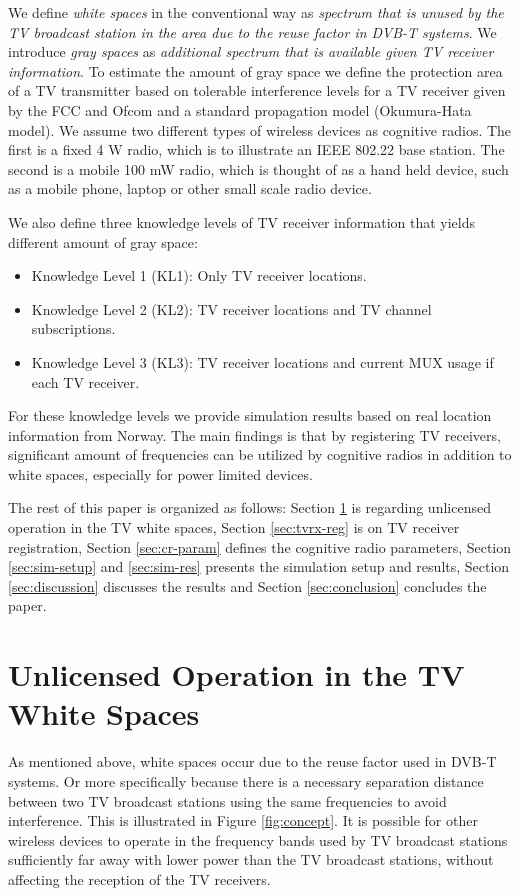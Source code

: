 \documentclass[journal,11pt,draftclsnofoot,onecolumn]{IEEEtran}
\begin{document}
We define \textit{white spaces} in the conventional way as \textit{spectrum that is unused by the TV broadcast station in the area due to the reuse factor in DVB-T systems}. We introduce \textit{gray spaces} as \textit{additional spectrum that is available given TV receiver information}. To estimate the amount of gray space we define the protection area of a TV transmitter based on tolerable interference levels for a TV receiver given by the FCC and Ofcom and a standard propagation model (Okumura-Hata model). We assume two different types of wireless devices as cognitive radios. The first is a fixed 4 W radio, which is to illustrate an IEEE 802.22 base station. The second is a mobile 100 mW radio, which is thought of as a hand held device, such as a mobile phone, laptop or other small scale radio device.

We also define three knowledge levels of TV receiver information that yields different amount of gray space:
\begin{itemize}
\item Knowledge Level 1 (KL1): Only TV receiver locations. \\
\item Knowledge Level 2 (KL2): TV receiver locations and TV channel subscriptions.\\
\item Knowledge Level 3 (KL3): TV receiver locations and current MUX usage if each TV receiver. \end{itemize}
For these knowledge levels we provide simulation results based on real location information from Norway. The main findings is that by registering TV receivers, significant amount of frequencies can be utilized by cognitive radios in addition to white spaces, especially for power limited devices.

The rest of this paper is organized as follows: Section \ref{sec:2} is regarding unlicensed operation in the TV white spaces, Section \ref{sec:tvrx-reg} is on TV receiver registration, Section \ref{sec:cr-param} defines the cognitive radio parameters, Section \ref{sec:sim-setup} and \ref{sec:sim-res} presents the simulation setup and results, Section \ref{sec:discussion} discusses the results and Section \ref{sec:conclusion} concludes the paper.

\section{Unlicensed Operation in the TV White Spaces}
\label{sec:2}
As mentioned above, white spaces occur due to the reuse factor used in DVB-T systems. Or more specifically because there is a necessary separation distance between two TV broadcast stations using the same frequencies to avoid interference. This is illustrated in Figure \ref{fig:concept}. It is possible for other wireless devices to operate in the frequency bands used by TV broadcast stations sufficiently far away with lower power than the TV broadcast stations, without affecting the reception of the TV receivers.
\end{document}
